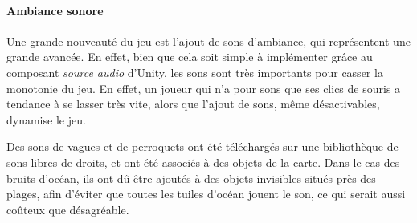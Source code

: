     \paragraph{Ambiance sonore}

    Une grande nouveauté du jeu est l'ajout de sons d'ambiance, qui représentent une grande avancée. En effet, bien que cela soit 
    simple à implémenter grâce au composant \textit{source audio} d'Unity, les sons sont très importants pour casser 
    la monotonie du jeu. En effet, un joueur qui n'a pour sons que ses clics de souris a tendance à se lasser très vite, alors 
    que l'ajout de sons, même désactivables, dynamise le jeu.

    Des sons de vagues et de perroquets ont été téléchargés sur une bibliothèque de sons libres de droits, et ont été associés 
    à des objets de la carte. Dans le cas des bruits d'océan, ils ont dû être ajoutés à des objets invisibles situés près des 
    plages, afin d'éviter que toutes les tuiles d'océan jouent le son, ce qui serait aussi coûteux que désagréable. 

